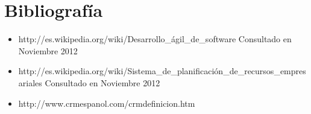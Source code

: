 \chapter*{Bibliograf\'ia}
\begin{itemize}
	\item http://es.wikipedia.org/wiki/Desarrollo\_\'agil\_de\_software Consultado en Noviembre 2012
	\item http://es.wikipedia.org/wiki/Sistema\_de\_planificaci\'on\_de\_recursos\_empresariales Consultado en Noviembre 2012
	\item http://www.crmespanol.com/crmdefinicion.htm
\end{itemize}